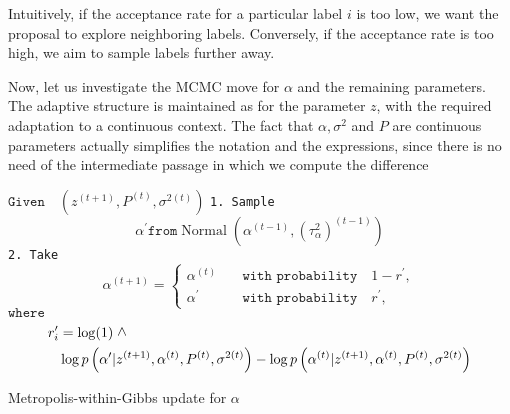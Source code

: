 \documentclass[11pt]{amsart}
\newcommand{\vertg}{\rotatebox{90}{$>$}}
\begin{document}
Intuitively, if the acceptance rate for a particular label $i$ is too low, we want the proposal to explore neighboring labels. Conversely, if the acceptance rate is too high, we aim to sample labels further away. 

Now, let us investigate the MCMC move for $\alpha$ and the remaining parameters. The adaptive structure is maintained as for the parameter $z$, with the required adaptation to a continuous context. The fact that $\alpha, \sigma^2$ and $P$ are continuous parameters actually simplifies the notation and the expressions, since there is no need of the intermediate passage in which we compute the difference 
\begin{algorithm}
\begin{algorithmic}[h]
\State $\texttt{Given} \quad \left( z^{(t+1)},P^{(t)},\sigma^{2(t)}\right)  $
\State
\State \texttt{1. Sample} \begin{equation}\label{eqn_general_proposal}
\alpha^{\prime} \texttt{from}  \operatorname{Normal}\left( \alpha^{(t-1)}, (\tau_{\alpha}^2)^{(t-1)} \right)
\end{equation}
\State \texttt{2. Take} \begin{equation}\label{eqn_acc_reject}
\alpha^{(t+1)} = 
\begin{cases}
\alpha^{(t)} \quad &\texttt{with probability} \quad 1 - r^\prime, \\
\alpha^{\prime} \quad &\texttt{with probability} \quad r^\prime,
\end{cases}
\end{equation}
\State $\texttt{where}$ \begin{align}\label{eqn:alpha_ratio}
r_i^\prime &= \log(1) \ \vertg \nonumber \\ 
 &\log{p \left( \alpha^{\prime}| z^{(t+1)},\alpha^{(t)}, P^{(t)},\sigma^{2(t)}\right)} 
 - \log{p\left( \alpha^{(t)}|z^{(t+1)},\alpha^{(t)},P^{(t)},\sigma^{2(t)}\right)}  
\end{align}
\end{algorithmic}
\caption{Metropolis-within-Gibbs update for $\alpha$}
\label{alg_general_algortm_alpha}
\end{algorithm}
\end{document}
